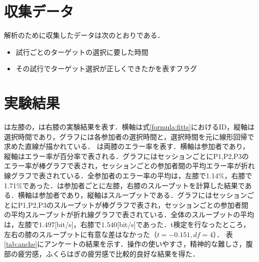 \section{収集データ}
解析のために収集したデータは次のとおりである．
\begin{itemize}
	\item 試行ごとのターゲットの選択に要した時間
	\item その試行でターゲット選択が正しくできたかを表すフラグ
\end{itemize}


\section{実験結果}
は左膝の，は右膝の実験結果を表す．横軸は式\ref{formula:fitts}におけるID，縦軸は選択時間であり，グラフには各参加者の選択時間と，選択時間を元に線形回帰で求めた直線が描かれている．
は両膝のエラー率を表す．横軸は参加者であり，縦軸はエラー率が百分率で表される．グラフにはセッションごとにP1,P2,P3のエラー率が棒グラフで表され，セッションごとの参加者間の平均エラー率が折れ線グラフで表されている．全参加者のエラー率の平均は，左膝で1.14\%，右膝で1.71\%であった．は参加者ごとに左膝，右膝のスループットを計算した結果である．横軸は参加者であり，縦軸はスループットである．グラフにはセッションごとにP1,P2,P3のスループットが棒グラフで表され，セッションごとの参加者間の平均スループットが折れ線グラフで表されている．全体のスループットの平均は，左膝で$1.497$[bit/s]，右膝で$1.540$[bit/s]であった．t検定を行なったところ，左右の膝のスループットに有意な差はなかった（$t=-0.151, df=4$）．
表\ref{tab:anche}にアンケートの結果を示す．操作の使いやすさ，精神的な難しさ，腹部の疲労感，ふくらはぎの疲労感で比較的良好な結果を得た．
